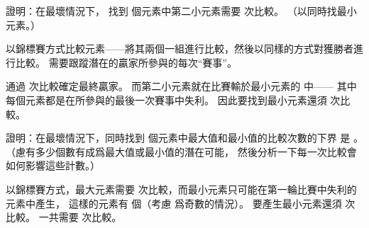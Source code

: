 \startsection[
  title={Minimum and maximum},
]

\startEXERCISE
證明：在最壞情況下，
找到  個元素中第二小元素需要  次比較。
（\hint 以同時找最小元素。）
\stopEXERCISE

\startANSWER
以錦標賽方式比較元素——將其兩個一組進行比較，然後以同樣的方式對獲勝者進行比較。
需要跟蹤潛在的贏家所參與的每次“賽事”。

通過  次比較確定最終贏家。
而第二小元素就在比賽輸於最小元素的  中——
其中每個元素都是在所參與的最後一次賽事中失利。
因此要找到最小元素還須  次比較。
\stopANSWER

\startEXERCISE\DIFFICULT
證明：在最壞情況下，同時找到  個元素中最大值和最小值的比較次數的下界
是 。
（\hint 慮有多少個數有成爲最大值或最小值的潛在可能，
然後分析一下每一次比較會如何影響這些計數。）
\stopEXERCISE

\startANSWER
以錦標賽方式，最大元素需要  次比較，而最小元素只可能在第一輪比賽中失利的元素中產生，
這樣的元素有  個（考慮  爲奇數的情況）。
要產生最小元素還須  次比較。
一共需要  次比較。
\stopANSWER

\stopsection
